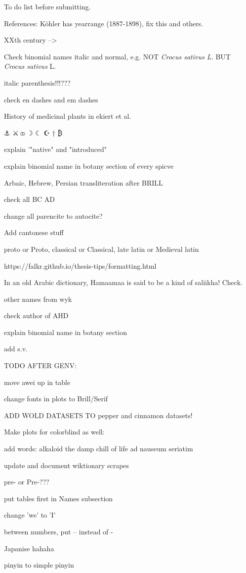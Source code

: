 To do list before submitting.

References: Köhler has yearrange (1887-1898), fix this and others.

XXth century --> \textss

Check binomial names italic and normal, e.g. NOT \textit{Crocus sativus L.} BUT \textit{Crocus sativus} L.

italic parenthesis!!!???

check en dashes and em dashes

History of medicinal plants in ekiert et al.

⚓ 
⚔
⚭
☽
☾
☪
†
₿

explain '"native" and "introduced"

explain binomial name in botany section of every spicve


Arbaic, Hebrew, Persian transliteration after BRILL

check all BC AD


change all parencite to autocite?

Add cantonese stuff

proto or Proto, classical or Classical, late latin or Medieval latin

https://falkr.github.io/thesis-tips/formatting.html

In an old Arabic dictionary, Hamaamaa is said to be a kind of saliikha! Check.

other names from wyk

check author of AHD

explain binomial name in botany section

add s.v.

TODO AFTER GENV:

move awei up in table

change fonts in plots to Brill/Serif

ADD WOLD DATASETS TO pepper and cinnamon datasets!

Make plots for colorblind as well:

add words:
alkaloid
the damp chill of life
ad nauseum
seriatim

update and document wiktionary scrapes



pre- or Pre-???


put tables first in Names subsection

change 'we' to 'I'

between numbers, put -- instead of -

Japanise hahaha

pinyin to simple pinyin